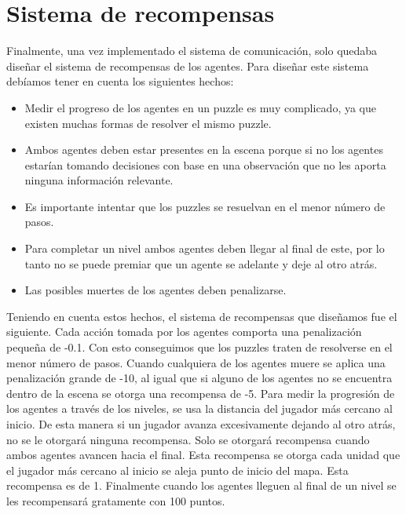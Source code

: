 \chapter{Sistema de recompensas}

Finalmente, una vez implementado el sistema de comunicación, solo quedaba diseñar el sistema de recompensas de los agentes. Para diseñar este sistema debíamos tener en cuenta los siguientes hechos:

\begin{itemize}
    \item Medir el progreso de los agentes en un puzzle es muy complicado, ya que existen muchas formas de resolver el mismo puzzle.
    \item Ambos agentes deben estar presentes en la escena porque si no los agentes estarían tomando decisiones con base en una observación que no les aporta ninguna información relevante.
    \item Es importante intentar que los puzzles se resuelvan en el menor número de pasos.
    \item Para completar un nivel ambos agentes deben llegar al final de este, por lo tanto no se puede premiar que un agente se adelante y deje al otro atrás.
    \item Las posibles muertes de los agentes deben penalizarse.
\end{itemize}

Teniendo en cuenta estos hechos, el sistema de recompensas que diseñamos fue el siguiente. Cada acción tomada por los agentes comporta una penalización pequeña de -0.1. Con esto conseguimos que los puzzles traten de resolverse en el menor número de pasos. Cuando cualquiera de los agentes muere se aplica una penalización grande de -10, al igual que si alguno de los agentes no se encuentra dentro de la escena se otorga una recompensa de -5. Para medir la progresión de los agentes a través de los niveles, se usa la distancia del jugador más cercano al inicio. De esta manera si un jugador avanza excesivamente dejando al otro atrás, no se le otorgará ninguna recompensa. Solo se otorgará recompensa cuando ambos agentes avancen hacia el final.  Esta recompensa se otorga cada unidad que el jugador más cercano al inicio se aleja punto de inicio del mapa. Esta recompensa es de 1. Finalmente cuando los agentes lleguen al final de un nivel se les recompensará gratamente con 100 puntos.